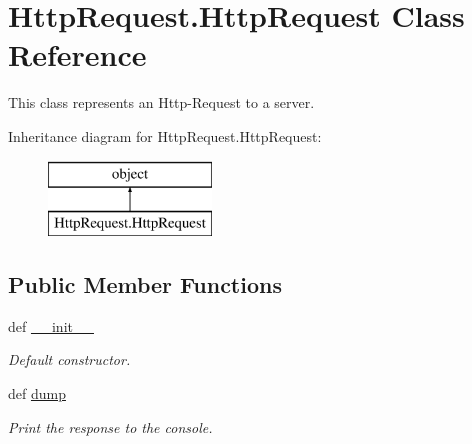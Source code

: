 \hypertarget{class_http_request_1_1_http_request}{\section{Http\-Request.\-Http\-Request Class Reference}
\label{class_http_request_1_1_http_request}
}


This class represents an Http-\/\-Request to a server.  


Inheritance diagram for Http\-Request.\-Http\-Request\-:\begin{figure}[H]
\begin{center}
\leavevmode
\includegraphics[height=2.000000cm]{class_http_request_1_1_http_request}
\end{center}
\end{figure}
\subsection*{Public Member Functions}
\begin{DoxyCompactItemize}
\item 
def \hyperlink{class_http_request_1_1_http_request_afdee625d1e83a73a7b2a4bb74f3b2c21}{\-\_\-\-\_\-init\-\_\-\-\_\-}
\begin{DoxyCompactList}\small\item\em Default constructor. \end{DoxyCompactList}\item 
\hypertarget{class_http_request_1_1_http_request_ad70cacde587c703f570e124aca5cca26}{def \hyperlink{class_http_request_1_1_http_request_ad70cacde587c703f570e124aca5cca26}{dump}}\label{class_http_request_1_1_http_request_ad70cacde587c703f570e124aca5cca26}

\begin{DoxyCompactList}\small\item\em Print the response to the console. \end{DoxyCompactList}\end{DoxyCompactItemize}
